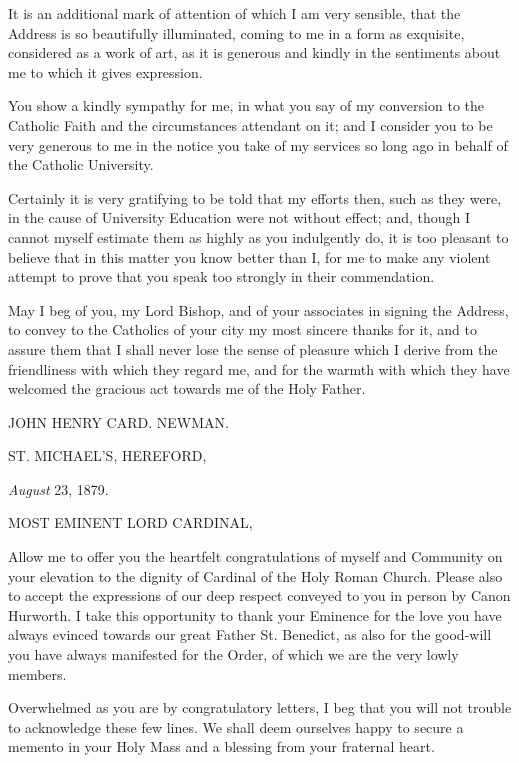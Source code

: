 It is an additional mark of attention of which I am very sensible,
that the Address is so beautifully illuminated, coming to me in a form
as exquisite, considered as a work of art, as it is generous and
kindly in the sentiments about me to which it gives expression.

You show a kindly sympathy for me, in what you say of my conversion
to the Catholic Faith and the circumstances attendant on it; and I
consider you to be very generous to me in the notice you take of my
services so long ago in behalf of the Catholic University.

Certainly it is very gratifying to be told that my efforts then,
such as they were, in the cause of University Education were not
without effect; and, though I cannot myself estimate them as highly as
you indulgently do, it is too pleasant to believe that in this matter
you know better than I, for me to make any violent attempt to prove
that you speak too strongly in their commendation.

May I beg of you, my Lord Bishop, and of your associates in signing
the Address, to convey to the Catholics of your city my most
sincere thanks for it, and to assure them that I shall never lose the
sense of pleasure which I derive from the friendliness with which they
regard me, and for the warmth with which they have welcomed the
gracious act towards me of the Holy Father.

JOHN HENRY CARD.
NEWMAN.


ST. MICHAEL'S, HEREFORD,

\emph{August} 23, 1879.

MOST EMINENT LORD
CARDINAL,

Allow me to offer you the heartfelt congratulations of myself and
Community on your elevation to the dignity of Cardinal of the Holy
Roman Church. Please also to accept the expressions of our deep
respect conveyed to you in person by Canon Hurworth. I take this
opportunity to thank your Eminence for the love you have always
evinced towards our great Father St. Benedict, as also for the
good-will you have always manifested for the Order, of which we are
the very lowly members.

Overwhelmed as you are by congratulatory letters, I beg that you
will not trouble to acknowledge these few lines. We shall deem
ourselves happy to secure a memento in your Holy Mass and a blessing
from your fraternal heart.


